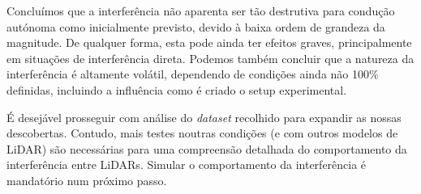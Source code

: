 Concluímos que a interferência não aparenta ser tão destrutiva para condução autónoma como inicialmente previsto, devido à baixa ordem de grandeza da magnitude. De qualquer forma, esta pode ainda ter efeitos graves, principalmente em situações de interferência direta. Podemos também concluir que a natureza da interferência é altamente volátil, dependendo de condições ainda não 100\% definidas, incluindo a influência como é criado o setup experimental.

É desejável prosseguir com análise do \textit{dataset} recolhido para expandir as nossas descobertas. Contudo, mais testes noutras condições (e com outros modelos de LiDAR) são necessárias para uma compreensão detalhada do comportamento da interferência entre LiDARs. Simular o comportamento da interferência é mandatório num próximo passo.

